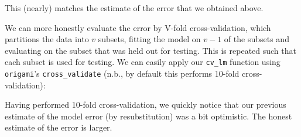 \documentclass[12pt, krantz2,]{krantz}
\newenvironment{Shaded}{\begin{snugshade}}{\end{snugshade}}
\newcommand{\CommentTok}[1]{\textcolor[rgb]{0.37,0.37,0.37}{\textit{#1}}}
\newcommand{\DataTypeTok}[1]{\textcolor[rgb]{0.27,0.27,0.27}{#1}}
\newcommand{\DecValTok}[1]{\textcolor[rgb]{0.06,0.06,0.06}{#1}}
\newcommand{\FloatTok}[1]{\textcolor[rgb]{0.06,0.06,0.06}{#1}}
\newcommand{\KeywordTok}[1]{\textcolor[rgb]{0.27,0.27,0.27}{\textbf{#1}}}
\newcommand{\NormalTok}[1]{#1}
\newcommand{\OperatorTok}[1]{\textcolor[rgb]{0.43,0.43,0.43}{\textbf{#1}}}
\newcommand{\OtherTok}[1]{\textcolor[rgb]{0.37,0.37,0.37}{#1}}
\newcommand{\StringTok}[1]{\textcolor[rgb]{0.5,0.5,0.5}{#1}}
\theoremstyle{definition}
\theoremstyle{definition}
\theoremstyle{definition}
\newcommand{\1}{\mathbbm{1}}
\begin{document}
\begin{Shaded}
\end{Shaded}

This (nearly) matches the estimate of the error that we obtained above.

We can more honestly evaluate the error by V-fold cross-validation, which
partitions the data into \(v\) subsets, fitting the model on \(v - 1\) of the
subsets and evaluating on the subset that was held out for testing. This is
repeated such that each subset is used for testing. We can easily apply our
\texttt{cv\_lm} function using \texttt{origami}'s \texttt{cross\_validate} (n.b., by default this
performs 10-fold cross-validation):

\begin{Shaded}
\end{Shaded}

Having performed 10-fold cross-validation, we quickly notice that our previous
estimate of the model error (by resubstitution) was a bit optimistic. The honest
estimate of the error is larger.
\end{document}
